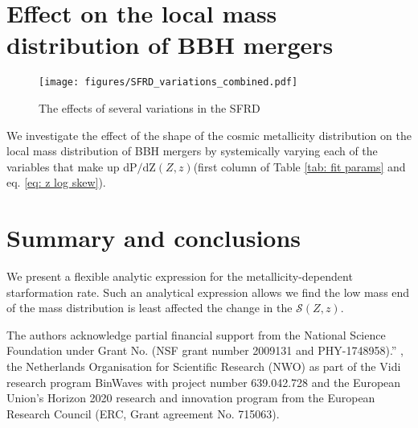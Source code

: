 \documentclass[twocolumn]{aastex631}
\newcommand{\SFRDzZ}{\ensuremath{\mathcal{S}(Z,z)}\xspace}
\newcommand{\dpdZ}{\ensuremath{\mathrm{dP/dZ}(Z,z)}\xspace}
\begin{document}
\section{Effect on the local mass distribution of BBH mergers}

\begin{figure*}
\texttt{[image: figures/SFRD\_variations\_combined.pdf]}
\caption{The effects of several variations in the SFRD  \label{fig: mass dists}}
\end{figure*}

We investigate the effect of the shape of the cosmic metallicity distribution on the local mass distribution of BBH mergers by systemically varying each of the variables that make up \dpdZ (first column of Table \ref{tab: fit params} and eq. \ref{eq: z log skew}). 







\section{Summary and conclusions}

We present a flexible analytic expression for the metallicity-dependent starformation rate.
Such an analytical expression allows 
we find the low mass end of the mass distribution is least affected the change in the \SFRDzZ. 


\begin{acknowledgments}
The authors acknowledge partial financial support from the  National Science Foundation under Grant No. (NSF grant number 2009131  and PHY-1748958).”
, the Netherlands Organisation for Scientific Research (NWO) as part of the Vidi research program BinWaves with project number 639.042.728 and the European Union’s Horizon 2020 research and innovation program from the European Research Council (ERC, Grant agreement No. 715063). 
\end{acknowledgments}



\end{document}
